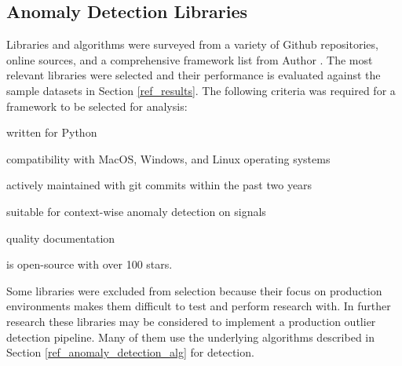 




\subsection{Anomaly Detection Libraries}
\label{ref_code_libraries}
 Libraries and algorithms were surveyed from a variety of Github repositories, online sources, and a comprehensive framework list from Author \cite{medico2020-ts-list}. The most relevant libraries were selected and their performance is evaluated against the sample datasets in Section \ref{ref_results}. The following criteria was required for a framework to be selected for analysis:
 \begin{inlinelist}
     \item written for Python
     \item compatibility with MacOS, Windows, and Linux operating systems
     \item actively maintained with git commits within the past two years
     \item suitable for context-wise anomaly detection on signals
     \item quality documentation
     \item is open-source with over 100 stars.
 \end{inlinelist}
 
 
Some libraries were excluded from selection because their focus on production environments makes them difficult to test and perform research with. In further research these libraries may be considered to implement a production outlier detection pipeline. Many of them use the underlying algorithms described in Section \ref{ref_anomaly_detection_alg} for detection. 
 
